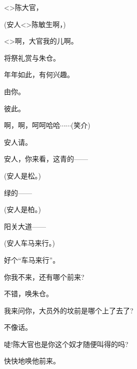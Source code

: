 {

\textless{}\!\textgreater{}陈大官，

(安人\hspace{30pt}\textless{}\!\textgreater{}陈敏生啊，)

\textless{}\!\textgreater{}啊，大官我的儿啊。

\vspace{5pt}





将祭礼赏与朱仓。

年年如此，有何兴趣。

由你。

彼此。

啊，啊，呵呵哈哈$\cdots{}\cdots{}$({\hwfs 笑介})

安人请。

安人，你来看，这青的------

(安人\hspace{30pt}是松。)

绿的------

(安人\hspace{30pt}是柏。)

阳关大道------

(安人\hspace{30pt}车马来行。)

好个``车马来行''。

你我不来，还有哪个前来?

不错，唤朱仓。

我来问你，大员外的坟前是哪个上了去了?

不像话。

唗!陈大官也是你这个奴才随便叫得的吗?

快快地唤他前来。

}

